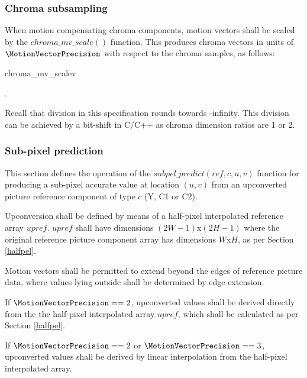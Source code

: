\subsubsection{Chroma subsampling}
\label{chromamvscale}

When motion compensating chroma components, motion vectors shall be scaled by the
$chroma\_mv\_scale()$ function. This produces chroma vectors in units of 
$\MotionVectorPrecision$ with respect to the chroma samples, as follows:

\begin{pseudo}{chroma\_mv\_scale}{v}
\end{pseudo}.

\begin{informative}
Recall that division in this specification rounds towards -infinity. This division can be achieved by a bit-shift in C/C++ as chroma dimension ratios are 1 or 2.
\end{informative}


\subsubsection{Sub-pixel prediction}
\label{upconvert}

This section defines the operation of the $subpel\_predict(ref, c, u, v)$ function
for producing a sub-pixel accurate value at location $(u,v)$ from an upconverted picture reference component of type $c$ (Y, C1 or C2). 

Upconversion shall be defined by means of a half-pixel interpolated reference array
$upref$.  $upref$ shall have dimensions $(2W-1)$x$(2H-1)$ where the original reference 
picture component array has dimensions $W$x$H$, as per Section \ref{halfpel}. 

Motion vectors shall be permitted to extend beyond the edges of reference picture data,
 where values lying outside shall be determined by edge extension. 

If $\MotionVectorPrecision==2$, upconverted values shall be derived directly from the
the half-pixel interpolated array $upref$, which shall be calculated as per Section \ref{halfpel}.

If $\MotionVectorPrecision==2$ or $\MotionVectorPrecision==3$, upconverted values shall be
derived by linear interpolation from the half-pixel interpolated array.


